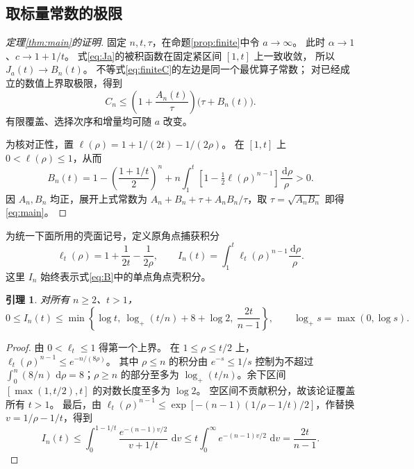\documentclass[UTF8,a4paper,11pt,fontset=fandol]{ctexart}
\newtheorem{lemma}{引理}[section]
\theoremstyle{remark}
\newcommand{\dint}{\,\mathrm d}
\begin{document}
\subsection{取标量常数的极限}
\begin{proof}[定理\ref{thm:main}的证明]
固定 $n,t,\tau$，在命题\ref{prop:finite}中令 $a\to\infty$。
此时 $\alpha\to1$、$c\to1+1/t$。
式\eqref{eq:Ja}的被积函数在固定紧区间 $[1,t]$ 上一致收敛，
所以 $J_a(t)\to B_n(t)$。
不等式\eqref{eq:finiteC}的左边是同一个最优算子常数；
对已经成立的数值上界取极限，得到
\[
 C_n\le
 \left(1+\frac{A_n(t)}{\tau}\right)\bigl(\tau+B_n(t)\bigr).
\]
有限覆盖、选择次序和增量均可随 $a$ 改变。

为核对正性，置 $\ell(\rho)=1+1/(2t)-1/(2\rho)$。
在 $[1,t]$ 上 $0<\ell(\rho)\le1$，从而
\[
 B_n(t)=
 1-\left(\frac{1+1/t}{2}\right)^n
 +n\int_1^t\left[1-\tfrac12\ell(\rho)^{n-1}\right]
                    \frac{\dint\rho}{\rho}>0.
\]
因 $A_n,B_n$ 均正，展开上式常数为
$A_n+B_n+\tau+A_nB_n/\tau$，取
$\tau=\sqrt{A_nB_n}$ 即得\eqref{eq:main}。
\end{proof}


为统一下面所用的壳面记号，定义原角点捕获积分
\[
 \ell_t(\rho)=1+\frac1{2t}-\frac1{2\rho},\qquad
 I_n(t)=\int_1^t\ell_t(\rho)^{n-1}\frac{\dint\rho}{\rho}.
\]
这里 $I_n$ 始终表示式\eqref{eq:B}中的单点角点壳积分。

\begin{lemma}\label{lem:integral-uniform}
对所有 $n\ge2$、$t>1$，
\[
 0\le I_n(t)\le
 \min\left\{\log t,\ \log_+(t/n)+8+\log2,\ \frac{2t}{n-1}\right\},
 \qquad \log_+s=\max(0,\log s).
\]
\end{lemma}
\begin{proof}
由 $0<\ell_t\le1$ 得第一个上界。
在 $1\le\rho\le t/2$ 上，
$\ell_t(\rho)^{n-1}\le e^{-n/(8\rho)}$。
其中 $\rho\le n$ 的积分由 $e^{-s}\le1/s$ 控制为不超过
$\int_0^n(8/n)\,\dint\rho=8$；$\rho\ge n$ 的部分至多为
$\log_+(t/n)$。余下区间 $[\max(1,t/2),t]$ 的对数长度至多为 $\log2$。
空区间不贡献积分，故该论证覆盖所有 $t>1$。
最后，由
$\ell_t(\rho)^{n-1}\le
\exp[-(n-1)(1/\rho-1/t)/2]$，作替换 $v=1/\rho-1/t$，得到
\[
 I_n(t)\le\int_0^{1-1/t}
 \frac{e^{-(n-1)v/2}}{v+1/t}\,\dint v
 \le t\int_0^\infty e^{-(n-1)v/2}\,\dint v
 =\frac{2t}{n-1}.
\]
\end{proof}
\end{document}
